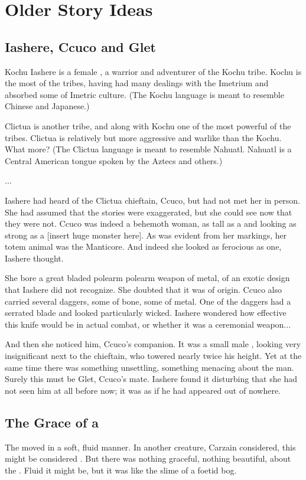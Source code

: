 \chapter{Older Story Ideas}
\section{Iashere, Ccuco and Glet}
Kochu Iashere is a female \meccaran, a warrior and adventurer of the Kochu tribe. Kochu is the most  of the \meccaran{} tribes, having had many dealings with the Imetrium and absorbed some of Imetric culture. (The Kochu language is meant to resemble Chinese and Japanese.) 

Clictua is another \meccaran{} tribe, and along with Kochu one of the most powerful of the tribes. Clictua is relatively  but more aggressive and warlike than the Kochu. What more? (The Clictua language is meant to resemble Nahuatl. Nahuatl is a Central American tongue spoken by the Aztecs and others.) 

...

Iashere had heard of the Clictua chieftain, Ccuco, but had not met her in person. She had assumed that the stories were exaggerated, but she could see now that they were not. Ccuco was indeed a behemoth woman, as tall as a \scatha{} and looking as strong as a [insert huge monster here]. As was evident from her markings, her totem animal was the Manticore. And indeed she looked as ferocious as one, Iashere thought. 

She bore a great bladed polearm polearm weapon of metal, of an exotic design that Iashere did not recognize. She doubted that it was of \meccaran{} origin. Ccuco also carried several daggers, some of bone, some of metal. One of the daggers had a serrated blade and looked particularly wicked. Iashere wondered how effective this knife would be in actual combat, or whether it was a ceremonial weapon... 

And then she noticed him, Ccuco's companion. It was a small male \meccaran, looking very insignificant next to the chieftain, who towered nearly twice his height. Yet at the same time there was something unsettling, something menacing about the man. Surely this must be Glet, Ccuco's mate. Iashere found it disturbing that she had not seen him at all before now; it was as if he had appeared out of nowhere. 



\section{The Grace of a \Bane}
The \bane{} moved in a soft, fluid manner. In another creature, Carzain considered, this might be considered . But there was nothing graceful, nothing beautiful, about the \Bane. Fluid it might be, but it was like the slime of a foetid bog. 



